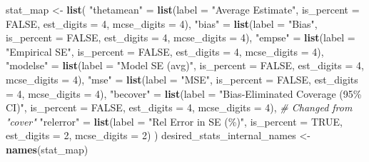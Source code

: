 \documentclass[
]{article}
\newenvironment{Shaded}{\begin{snugshade}}{\end{snugshade}}
\newcommand{\AttributeTok}[1]{\textcolor[rgb]{0.13,0.29,0.53}{#1}}
\newcommand{\CommentTok}[1]{\textcolor[rgb]{0.56,0.35,0.01}{\textit{#1}}}
\newcommand{\ConstantTok}[1]{\textcolor[rgb]{0.56,0.35,0.01}{#1}}
\newcommand{\DecValTok}[1]{\textcolor[rgb]{0.00,0.00,0.81}{#1}}
\newcommand{\FunctionTok}[1]{\textcolor[rgb]{0.13,0.29,0.53}{\textbf{#1}}}
\newcommand{\NormalTok}[1]{#1}
\newcommand{\OtherTok}[1]{\textcolor[rgb]{0.56,0.35,0.01}{#1}}
\newcommand{\StringTok}[1]{\textcolor[rgb]{0.31,0.60,0.02}{#1}}
\begin{document}
\begin{Shaded}
\begin{Highlighting}[]
\NormalTok{stat\_map }\OtherTok{\textless{}{-}} \FunctionTok{list}\NormalTok{(}
  \StringTok{"thetamean"}     \OtherTok{=} \FunctionTok{list}\NormalTok{(}\AttributeTok{label =} \StringTok{"Average Estimate"}\NormalTok{, }\AttributeTok{is\_percent =} \ConstantTok{FALSE}\NormalTok{, }\AttributeTok{est\_digits =} \DecValTok{4}\NormalTok{, }\AttributeTok{mcse\_digits =} \DecValTok{4}\NormalTok{),}
  \StringTok{"bias"}          \OtherTok{=} \FunctionTok{list}\NormalTok{(}\AttributeTok{label =} \StringTok{"Bias"}\NormalTok{, }\AttributeTok{is\_percent =} \ConstantTok{FALSE}\NormalTok{, }\AttributeTok{est\_digits =} \DecValTok{4}\NormalTok{, }\AttributeTok{mcse\_digits =} \DecValTok{4}\NormalTok{),}
  \StringTok{"empse"}         \OtherTok{=} \FunctionTok{list}\NormalTok{(}\AttributeTok{label =} \StringTok{"Empirical SE"}\NormalTok{, }\AttributeTok{is\_percent =} \ConstantTok{FALSE}\NormalTok{, }\AttributeTok{est\_digits =} \DecValTok{4}\NormalTok{, }\AttributeTok{mcse\_digits =} \DecValTok{4}\NormalTok{),}
  \StringTok{"modelse"}       \OtherTok{=} \FunctionTok{list}\NormalTok{(}\AttributeTok{label =} \StringTok{"Model SE (avg)"}\NormalTok{, }\AttributeTok{is\_percent =} \ConstantTok{FALSE}\NormalTok{, }\AttributeTok{est\_digits =} \DecValTok{4}\NormalTok{, }\AttributeTok{mcse\_digits =} \DecValTok{4}\NormalTok{),}
  \StringTok{"mse"}           \OtherTok{=} \FunctionTok{list}\NormalTok{(}\AttributeTok{label =} \StringTok{"MSE"}\NormalTok{, }\AttributeTok{is\_percent =} \ConstantTok{FALSE}\NormalTok{, }\AttributeTok{est\_digits =} \DecValTok{4}\NormalTok{, }\AttributeTok{mcse\_digits =} \DecValTok{4}\NormalTok{),}
  \StringTok{"becover"}       \OtherTok{=} \FunctionTok{list}\NormalTok{(}\AttributeTok{label =} \StringTok{"Bias{-}Eliminated Coverage (95\% CI)"}\NormalTok{, }\AttributeTok{is\_percent =} \ConstantTok{FALSE}\NormalTok{, }\AttributeTok{est\_digits =} \DecValTok{4}\NormalTok{, }\AttributeTok{mcse\_digits =} \DecValTok{4}\NormalTok{), }\CommentTok{\# Changed from "cover"}
  \StringTok{"relerror"}      \OtherTok{=} \FunctionTok{list}\NormalTok{(}\AttributeTok{label =} \StringTok{"Rel Error in SE (\%)"}\NormalTok{, }\AttributeTok{is\_percent =} \ConstantTok{TRUE}\NormalTok{, }\AttributeTok{est\_digits =} \DecValTok{2}\NormalTok{, }\AttributeTok{mcse\_digits =} \DecValTok{2}\NormalTok{)}
\NormalTok{)}
\NormalTok{desired\_stats\_internal\_names }\OtherTok{\textless{}{-}} \FunctionTok{names}\NormalTok{(stat\_map)}


\end{Highlighting}
\end{Shaded}
\end{document}
